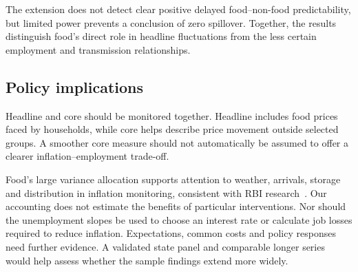\documentclass[10pt,a4paper]{article}
\begin{document}
The extension does not detect clear positive delayed food--non-food predictability, but limited power prevents a conclusion of zero spillover. Together, the results distinguish food's direct role in headline fluctuations from the less certain employment and transmission relationships.

\subsection{Policy implications}

Headline and core should be monitored together. Headline includes food prices faced by households, while core helps describe price movement outside selected groups. A smoother core measure should not automatically be assumed to offer a clearer inflation--employment trade-off.

Food's large variance allocation supports attention to weather, arrivals, storage and distribution in inflation monitoring, consistent with RBI research~\cite{mohan2026,patra2024}. Our accounting does not estimate the benefits of particular interventions. Nor should the unemployment slopes be used to choose an interest rate or calculate job losses required to reduce inflation. Expectations, common costs and policy responses need further evidence. A validated state panel and comparable longer series would help assess whether the sample findings extend more widely.
\label{main:last}
\end{document}
